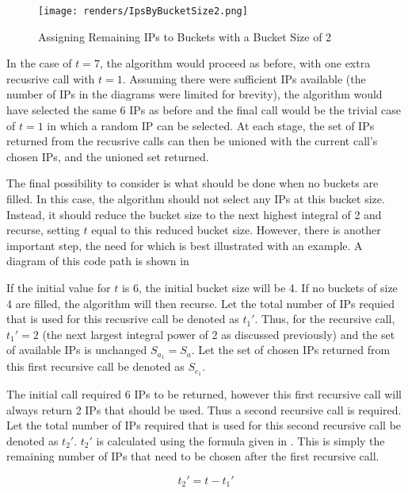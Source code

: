 \begin{figure}[H]
      \centering
      \texttt{[image: renders/IpsByBucketSize2.png]}
      \caption{Assigning Remaining IPs to Buckets with a Bucket Size of 2}
      \label{fig:exampleIpsByBucket2}
\end{figure}

In the case of $t = 7$, the algorithm would proceed as before, with one extra recusrive call with $t = 1$. Assuming there were sufficient IPs available (the number of IPs in the diagrams were limited for brevity), the algorithm would have selected the same 6 IPs as before and the final call would be the trivial case of $t = 1$ in which a random IP can be selected. At each stage, the set of IPs returned from the recusrive calls can then be unioned with the current call's chosen IPs, and the unioned set returned. 

The final possibility to consider is what should be done when no buckets are filled. In this case, the algorithm should not select any IPs at this bucket size. Instead, it should reduce the bucket size to the next highest integral of 2 and recurse, setting $t$ equal to this reduced bucket size. However, there is another important step, the need for which is best illustrated with an example. A diagram of this code path is shown in 

If the initial value for $t$ is 6, the initial bucket size will be 4. If no buckets of size 4 are filled, the algorithm will then recurse. Let the total number of IPs requied that is used for this recusrive call be denoted as $t_1'$. Thus, for the recursive call, $t_1' = 2$ (the next largest integral power of 2 as discussed previously) and the set of available IPs is unchanged $S_{a_1} = S_a$. Let the set of chosen IPs returned from this first recursive call be denoted as $S_{c_1}$.

The initial call required 6 IPs to be returned, however this first recursive call will always return 2 IPs that should be used. Thus a second recursive call is required. Let the total number of IPs required that is used for this second recursive call be denoted as $t_2'$. $t_2'$ is calculated using the formula given in . This is simply the remaining number of IPs that need to be chosen after the first recursive call. 

\begin{equation}\label{eq:secondRecurseT2}
t_2' = t - t_1'
\end{equation}

